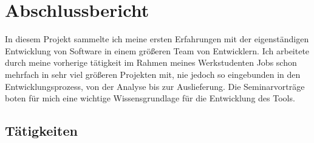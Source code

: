 \section{Abschlussbericht}

In diesem Projekt sammelte ich meine ersten Erfahrungen mit der eigenständigen Entwicklung von Software in einem größeren Team von Entwicklern. Ich arbeitete durch meine vorherige tätigkeit im Rahmen meines Werkstudenten Jobs schon mehrfach in sehr viel größeren Projekten mit, nie jedoch so eingebunden in den Entwicklungsprozess, von der Analyse bis zur Auslieferung. 
Die Seminarvorträge boten für mich eine wichtige Wissensgrundlage für die Entwicklung des Tools.


\subsection{Tätigkeiten}

